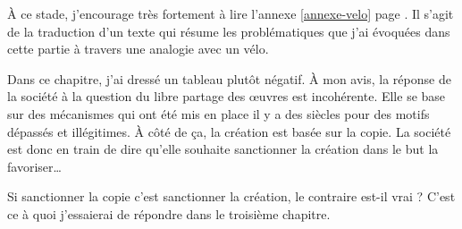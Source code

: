 À ce stade, j'encourage très fortement à lire l'annexe \ref*{annexe-velo} page \pageref{annexe-velo}.
Il s'agit de la traduction d'un texte qui résume les problématiques que j'ai évoquées dans cette partie à travers une analogie avec un vélo.

\vspace{50pt}

Dans ce chapitre, j'ai dressé un tableau plutôt négatif.
À mon avis, la réponse de la société à la question du libre partage des œuvres est incohérente.
Elle se base sur des mécanismes qui ont été mis en place il y a des siècles pour des motifs dépassés et illégitimes.
À côté de ça, la création est basée sur la copie.
La société est donc en train de dire qu'elle souhaite sanctionner la création dans le but la favoriser\dots{}

Si sanctionner la copie c'est sanctionner la création, le contraire est-il vrai ?
C'est ce à quoi j'essaierai de répondre dans le troisième chapitre.
